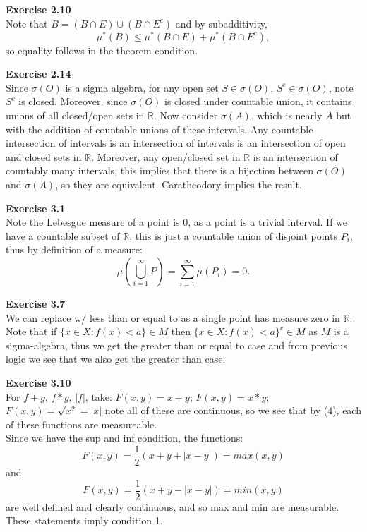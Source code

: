 \documentclass[UTF8]{article}
\begin{document}
\medskip
\noindent \textbf{Exercise 2.10} \\
Note that $B = (B \cap E) \cup (B \cap E^c)$ and by subadditivity, 
$$\mu^*(B) \leq \mu^*(B \cap E) + \mu^*(B \cap E^c), $$ so equality follows in the theorem condition.

\medskip
\noindent \textbf{Exercise 2.14} \\

Since $\sigma(O)$ is a sigma algebra, for any open set $S \in \sigma(O)$, $S^c \in  \sigma(O)$, note $S^c$ is closed. Moreover, since $ \sigma(O)$ is closed under countable union, it contains unions of all closed/open sets in $\mathbb{R}$. Now consider $ \sigma(A)$, which is nearly $A$ but with the addition of countable unions of these intervals. Any countable intersection of intervals is an intersection of intervals is an intersection of open and closed sets in $\mathbb{R}$. Moreover, any open/closed set in $\mathbb{R}$ is an intersection of countably many intervals, this implies that there is a bijection between  $\sigma(O)$ and $ \sigma(A)$, so they are equivalent. Caratheodory implies the result. 

\medskip
\noindent \textbf{Exercise 3.1} \\
Note the Lebesgue measure of a point is 0, as a point is a trivial interval. If we have a countable subset of $\mathbb{R}$, this is just a countable union of disjoint points $P_i$, thus by definition of a measure:
$$\mu(\bigcup\limits_{i=1}^{\infty} P) = \sum\limits_{i=1}^{\infty} \mu(P_i) = 0.$$

\medskip
\noindent \textbf{Exercise 3.7} \\
We can replace w/ less than or equal to as a single point has measure zero in $\mathbb{R}$. Note that if $\{x\in X : f(x) < a \} \in M$ then $\{x \in X: f(x) < a\}^c \in M$ as $M$ is a sigma-algebra, thus we get the greater than or equal to case and from previous logic we see that we also get the greater than case.

\medskip
\noindent \textbf{Exercise 3.10} \\ 
For $f+g$, $f*g$, $|f|$, take: $F(x,y) = x+y$; $F(x,y) = x*y$;  $F(x,y) = \sqrt{x^2} = |x|$ note all of these are continuous, so we see that by (4), each of these functions are measureable. \\

Since we have the sup and inf condition, the functions:
$$F(x,y) = \frac{1}{2}(x + y + |x-y|) = max(x,y)$$ and 
$$F(x,y) = \frac{1}{2}(x + y - |x-y|) = min(x,y)$$ are well defined and clearly continuous, and so max and min are measurable. These statements imply condition 1. 
\end{document}

